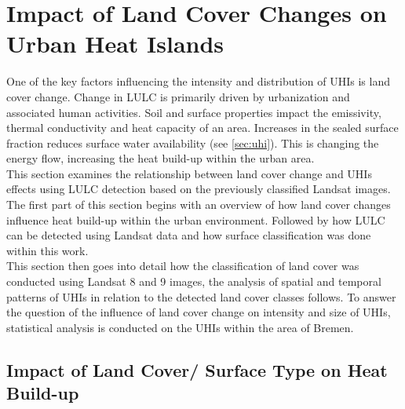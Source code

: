 \documentclass[12pt,a4paper, english,twoside]{scrartcl}
\begin{document}
\section{Impact of Land Cover Changes on Urban Heat Islands}\label{sec:LULC}
      One of the key factors influencing the intensity and distribution of \glspl{UHI} is land cover change.
      Change in \gls{LULC} is primarily driven by urbanization and associated human activities.
      Soil and surface properties impact the emissivity, thermal conductivity and heat capacity of an area.
      Increases in the sealed surface fraction reduces surface water availability (see \cref{sec:uhi}).
      This is changing the energy flow, increasing the heat build-up within the urban area.
      \\    
      This section examines the relationship between land cover change and \glspl{UHI} effects using \gls{LULC} detection based on the previously classified Landsat images.
      The first part of this section begins with an overview of how land cover changes influence heat build-up within the urban environment. 
      Followed by how \gls{LULC} can be detected using Landsat data and how surface classification was done within this work. 
      \\
      This section then goes into detail how the classification of land cover was conducted using Landsat 8 and 9 images, the analysis of spatial and temporal patterns of \glspl{UHI} in relation to the detected land cover classes follows.
      To answer the question  of the influence of land cover change on intensity and size of \glspl{UHI}, statistical analysis is conducted on the \glspl{UHI} within the area of Bremen. \\
    \subsection{Impact of Land Cover/ Surface Type on Heat Build-up}

\end{document}
